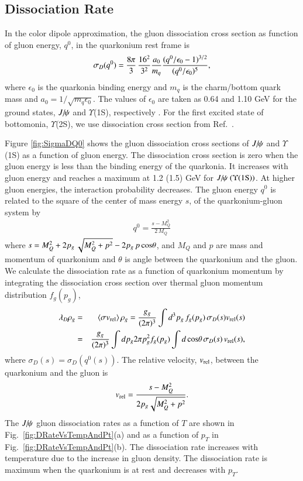{  \subsection{Dissociation Rate}
  In the color dipole approximation, the gluon dissociation cross section as function of gluon energy, $q^0$,
  in the quarkonium rest frame is~\cite{Bhanot:1979vb}
  \begin{equation}
    \sigma_{D}(q^{0}) = {8\pi \over 3} \, {16^2 \over 3^2} {a_0 \over m_q}  \frac{(q^0/\epsilon_0 - 1)^{3/2}} {(q^0/\epsilon_0)^5},
  \end{equation}
  where $\epsilon_0$ is the quarkonia binding energy and $m_q$ is the charm/bottom quark mass 
  and $a_0=1/\sqrt{m_q\epsilon_0}$.
  The values of $\epsilon_0$ are taken as 0.64 and 1.10 GeV for the ground states, $J\hspace{-.08em}/\hspace{-.14em}\psi$ and $\Upsilon$(1S),
  respectively \cite{Karsch:1987pv}.
  For the first excited state of bottomonia, $\Upsilon$(2S), we use dissociation
  cross section from Ref.~\cite{Arleo:2001mp}.
  
  Figure \ref{fig:SigmaDQ0} shows the gluon dissociation cross sections of $J\hspace{-.08em}/\hspace{-.14em}\psi$ and $\Upsilon$(1S)
  as a function of gluon energy. The dissociation cross section is zero when the gluon energy is less 
  than the binding energy of the quarkonia. It increases with gluon energy and reaches a maximum at 1.2 (1.5) GeV for 
  $J\hspace{-.08em}/\hspace{-.14em}\psi~(\Upsilon(1{\rm S}))$. At higher gluon energies, the interaction probability decreases. The gluon energy $q^0$ 
  is related to the square of the center of mass energy $s$, of the quarkonium-gluon system by
  \begin{eqnarray}
    q^{0} = \frac{s-M_{Q}^{2}}{2\,M_{Q}}
  \end{eqnarray}  
  where $s=M_{Q}^{2} + 2  p_g \, \sqrt{M_{Q}^2 + p^2} - 2  p_g \, p \, {\rm cos\theta}$, and $M_{Q}$ and $p$ 
  are mass and momentum of quarkonium and $\theta$ is angle between the quarkonium and the gluon.
  We calculate the dissociation rate as a function of quarkonium momentum 
  by integrating the dissociation cross section over thermal gluon momentum 
  distribution $f_{g}(p_g)$,   
  \begin{eqnarray}
    \lambda_{D} \rho_{g}  & = & \langle \sigma v_{\rm rel} \rangle \,\rho_{g}  = \frac{g_g}{(2\pi)^{3}} \int d^{3}p_g \, f_{g}(p_g)  \, \sigma_{D}(s) v_{\rm rel}(s)  \nonumber \\ 
    & = & \frac{g_g}{(2\pi)^{3}} \int dp_g 2\pi p_g^{2} f_{g}(p_g) \int d\,{\rm cos\theta}\,\sigma_{D}(s)\,v_{\rm rel}(s),
  \end{eqnarray}
  where $\sigma_{D}(s) = \sigma_{D}(q^0(s))$.
  The relative velocity, $v_{\rm rel}$, between the quarkonium and the gluon is
  \begin{eqnarray}
    v_{\rm rel}  = {s- M_{Q}^{2} \over 2  p_g\sqrt{M_{Q}^2 + p^2}}.  
    \label{eq7}
  \end{eqnarray}
  The $J\hspace{-.08em}/\hspace{-.14em}\psi$ gluon dissociation rates as a function of $T$ are shown in 
  Fig.~\ref{fig:DRateVsTempAndPt}(a) and as a function of $p_T$ in Fig.~\ref{fig:DRateVsTempAndPt}(b).
  The dissociation rate increases with temperature due to the increase in gluon density. 
  The dissociation rate is maximum when the quarkonium is at rest and decreases with $p_T$.

}
